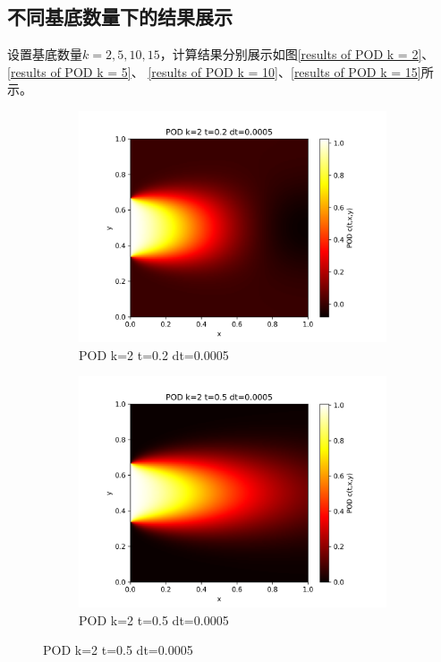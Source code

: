 \documentclass[11pt,a4 paper,one side]{article}
\begin{document}
\subsection{不同基底数量下的结果展示}
设置基底数量$k=2,5,10,15$，计算结果分别展示如图\ref{results of POD k = 2}、\ref{results of POD k = 5}、
\ref{results of POD k = 10}、\ref{results of POD k = 15}所示。
\begin{figure}[htbp]
    \centering
    \begin{subfigure}{0.45\textwidth}
        \includegraphics[width=\textwidth]{POD k=2 t=0.2 dt=0.0005.png}
        \caption{POD k=2 t=0.2 dt=0.0005}
        \label{POD k=2 t=0.2 dt=0.0005}
    \end{subfigure}
    \hfill
    \begin{subfigure}{0.45\textwidth}
        \includegraphics[width=\textwidth]{POD k=2 t=0.5 dt=0.0005.png}
        \caption{POD k=2 t=0.5 dt=0.0005}
        \label{POD k=2 t=0.5 dt=0.0005}
    \end{subfigure}
    

\end{figure}
\end{document}
